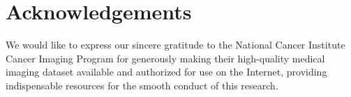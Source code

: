 \documentclass[a4paper, times, 10pt,twocolumn]{article}
\begin{document}
\section*{Acknowledgements}
We would like to express our sincere gratitude to the National Cancer Institute Cancer Imaging Program for generously making their high-quality medical imaging dataset available and authorized for use on the Internet, providing indispensable resources for the smooth conduct of this research.


% 


%
%


\end{document}
